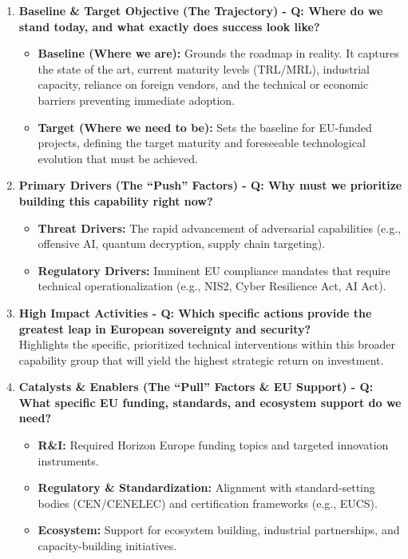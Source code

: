 \documentclass[11pt,a4paper]{article}
\begin{document}
\begin{enumerate}
    \item \textbf{Baseline \& Target Objective (The Trajectory) - Q: Where do we stand today, and what exactly does success look like?}
    \begin{itemize}
        \item \textbf{Baseline (Where we are):} Grounds the roadmap in reality. It captures the state of the art, current maturity levels (TRL/MRL), industrial capacity, reliance on foreign vendors, and the technical or economic barriers preventing immediate adoption.
        \item \textbf{Target (Where we need to be):} Sets the baseline for EU-funded projects, defining the target maturity and foreseeable technological evolution that must be achieved.
    \end{itemize}
    
    \item \textbf{Primary Drivers (The ``Push'' Factors) - Q: Why must we prioritize building this capability right now?}
    \begin{itemize}
        \item \textbf{Threat Drivers:} The rapid advancement of adversarial capabilities (e.g., offensive AI, quantum decryption, supply chain targeting).
        \item \textbf{Regulatory Drivers:} Imminent EU compliance mandates that require technical operationalization (e.g., NIS2, Cyber Resilience Act, AI Act).
    \end{itemize}
    
    \item \textbf{High Impact Activities - Q: Which specific actions provide the greatest leap in European sovereignty and security?}
    \\ Highlights the specific, prioritized technical interventions within this broader capability group that will yield the highest strategic return on investment.
    
    \item \textbf{Catalysts \& Enablers (The ``Pull'' Factors \& EU Support) - Q: What specific EU funding, standards, and ecosystem support do we need?}
    \begin{itemize}
        \item \textbf{R\&I:} Required Horizon Europe funding topics and targeted innovation instruments.
        \item \textbf{Regulatory \& Standardization:} Alignment with standard-setting bodies (CEN/CENELEC) and certification frameworks (e.g., EUCS).
        \item \textbf{Ecosystem:} Support for ecosystem building, industrial partnerships, and capacity-building initiatives.
    \end{itemize}
    

\end{enumerate}
\end{document}
